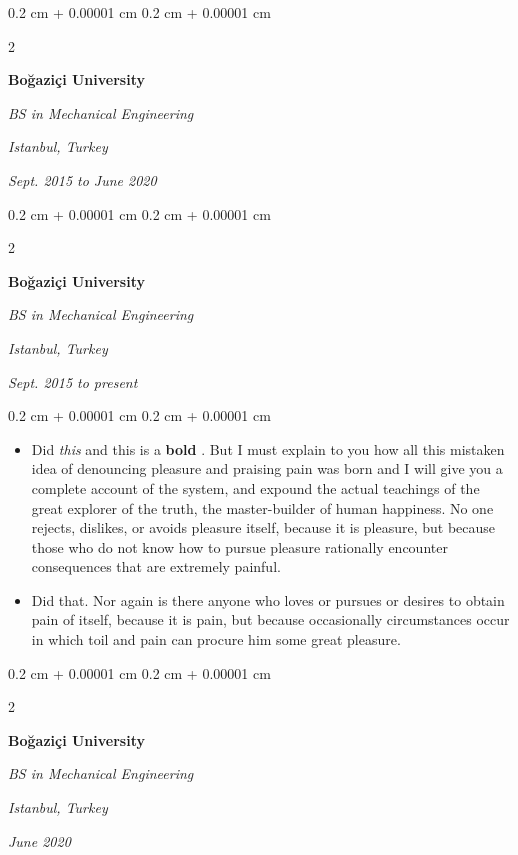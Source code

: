 \documentclass[10pt, letterpaper]{article}
\newenvironment{highlights}{
    \begin{itemize}[
        topsep=0.10 cm,
        parsep=0.10 cm,
        partopsep=0pt,
        itemsep=0pt,
        leftmargin=0.4 cm + 10pt
    ]
}{
    \end{itemize}
} %
\newenvironment{onecolentry}{
    \begin{adjustwidth}{
        0.2 cm + 0.00001 cm
    }{
        0.2 cm + 0.00001 cm
    }
}{
    \end{adjustwidth}
} %
\newenvironment{twocolentry}[2][]{
    \onecolentry
    \def\secondColumn{#2}
    \setcolumnwidth{\fill, 4.5 cm}
    \begin{paracol}{2}
}{
    \switchcolumn \raggedleft \secondColumn
    \end{paracol}
    \endonecolentry
} %
\let\hrefWithoutArrow\href
\renewcommand{\href}[2]{\hrefWithoutArrow{#1}{\mbox{\ifthenelse{\equal{#2}{}}{ }{#2 }\raisebox{.15ex}{\footnotesize \faExternalLink*}}}}
\begin{document}
        \vspace{0.2 cm-3px}

        \begin{twocolentry}{
        \textit{Istanbul, Turkey}    
            
        \textit{Sept. 2015 to June 2020}}
            \textbf{Boğaziçi University}

            \textit{BS in Mechanical Engineering}
        \end{twocolentry}



        \vspace{0.2 cm-3px}

        \begin{twocolentry}{
        \textit{Istanbul, Turkey}    
            
        \textit{Sept. 2015 to present}}
            \textbf{Boğaziçi University}

            \textit{BS in Mechanical Engineering}
        \end{twocolentry}

        \vspace{0.10 cm-3px}
        \begin{onecolentry}
            \begin{highlights}
                \item Did \textit{this} and this is a \textbf{bold} \href{https://example.com}{link}. But I must explain to you how all this mistaken idea of denouncing pleasure and praising pain was born and I will give you a complete account of the system, and expound the actual teachings of the great explorer of the truth, the master-builder of human happiness. No one rejects, dislikes, or avoids pleasure itself, because it is pleasure, but because those who do not know how to pursue pleasure rationally encounter consequences that are extremely painful.
                \item Did that. Nor again is there anyone who loves or pursues or desires to obtain pain of itself, because it is pain, but because occasionally circumstances occur in which toil and pain can procure him some great pleasure.
            \end{highlights}
        \end{onecolentry}


        \vspace{0.2 cm-3px}

        \begin{twocolentry}{
        \textit{Istanbul, Turkey}    
            
        \textit{June 2020}}
            \textbf{Boğaziçi University}

            \textit{BS in Mechanical Engineering}
        \end{twocolentry}
\end{document}
